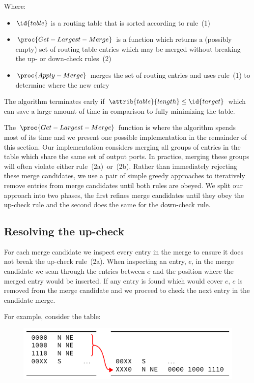 \documentclass[conference]{IEEEtran}
\begin{document}
  \noindent Where:
  \begin{itemize}
    \item $\id{table}$ is a routing table that is sorted according to rule~(1)
    \item $\proc{Get-Largest-Merge}$ is a function which returns a (possibly empty) set of routing table entries which may be merged without breaking the up- or down-check rules~(2)
    \item $\proc{Apply-Merge}$ merges the set of routing entries and uses rule~(1) to determine where the new entry
  \end{itemize}

  The algorithm terminates early if $\attrib{table}{length} \le \id{target}$ which can save a large amount of time in comparison to fully minimizing the table.

  The $\proc{Get-Largest-Merge}$ function is where the algorithm spends most of its time and we present one possible implementation in the remainder of this section.
  Our implementation considers merging all groups of entries in the table which share the same set of output ports.
  In practice, merging these groups will often violate either rule~(2a)~or~(2b).
  Rather than immediately rejecting these merge candidates, we use a pair of simple greedy approaches to iteratively remove entries from merge candidates until both rules are obeyed.
  We split our approach into two phases, the first refines merge candidates until they obey the up-check rule and the second does the same for the down-check rule.

  \subsection{Resolving the up-check}

  For each merge candidate we inspect every entry in the merge to ensure it does not break the up-check rule~(2a).
  When inspecting an entry, $e$, in the merge candidate we scan through the entries between $e$ and the position where the merged entry would be inserted.
  If any entry is found which would cover $e$, $e$ is removed from the merge candidate and we proceed to check the next entry in the candidate merge.

  For example, consider the table:\par\nopagebreak
  \begin{figure}[H]
    \centering
    \includegraphics{figures/upcheck_resolve_example_1}
  \end{figure}
\end{document}
